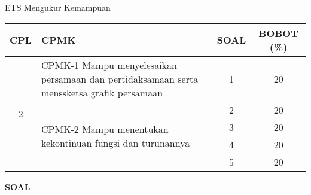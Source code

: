 \documentclass[11pt,openany,a4paper]{article}
\begin{document}
\begin{table}[h]
    \centering
    ETS Mengukur Kemampuan
    \begin{tabular}{|c|m{11cm}|c|c|}
        \hline
        CPL & CPMK                                                                                      & SOAL & BOBOT (\%) \\ \hline
        \multirow{5}{*}{2}
            & CPMK-1 Mampu menyelesaikan persamaan dan pertidaksamaan serta menssketsa grafik persamaan & 1    & 20         \\ \cline{2-4}
            & \multirow{4}{*}{CPMK-2 Mampu menentukan kekontinuan fungsi dan turunannya}                & 2    & 20         \\\cline{3-4}
            &                                                                                           & 3    & 20         \\ \cline{3-4}
            &                                                                                           & 4    & 20         \\ \cline{3-4}
            &                                                                                           & 5    & 20         \\ \hline
    \end{tabular}
\end{table}
{\centering\textbf{SOAL}}
\end{document}
